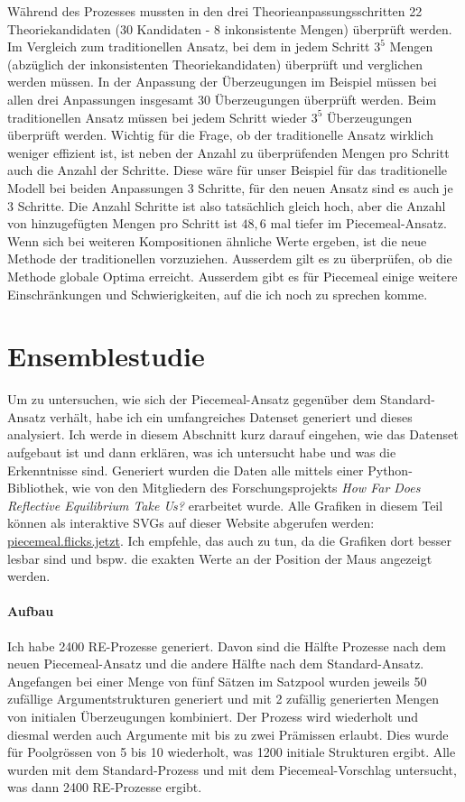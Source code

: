 \documentclass{article}
\begin{document}
 Während des Prozesses mussten in den drei Theorieanpassungsschritten 22 Theoriekandidaten (30 Kandidaten - 8 inkonsistente Mengen) überprüft werden.  Im Vergleich zum traditionellen Ansatz, bei dem in jedem Schritt $3^5$ Mengen (abzüglich der inkonsistenten Theoriekandidaten) überprüft und verglichen werden müssen. In der Anpassung der Überzeugungen im Beispiel müssen bei allen drei Anpassungen insgesamt 30 Überzeugungen überprüft werden. Beim traditionellen Ansatz müssen bei jedem Schritt wieder $3^5$ Überzeugungen überprüft werden. Wichtig für die Frage, ob der traditionelle Ansatz wirklich weniger effizient ist, ist neben der Anzahl zu überprüfenden Mengen pro Schritt auch die Anzahl der Schritte. Diese wäre für unser Beispiel für das traditionelle Modell bei beiden Anpassungen 3 Schritte, für den neuen Ansatz sind es auch je 3 Schritte. Die Anzahl Schritte ist also tatsächlich gleich hoch, aber die Anzahl von hinzugefügten Mengen pro Schritt ist $48,6$ mal tiefer im Piecemeal-Ansatz. Wenn sich bei weiteren Kompositionen ähnliche Werte ergeben, ist die neue Methode der traditionellen vorzuziehen. Ausserdem gilt es zu überprüfen, ob die Methode globale Optima erreicht. Ausserdem gibt es für Piecemeal einige weitere Einschränkungen und Schwierigkeiten, auf die ich noch zu sprechen komme.

\section{Ensemblestudie} \label{Ensemblestudie}

Um zu untersuchen, wie sich der Piecemeal-Ansatz gegenüber dem Standard-Ansatz verhält, habe ich ein umfangreiches Datenset generiert und dieses analysiert. Ich werde in diesem Abschnitt kurz darauf eingehen, wie das Datenset aufgebaut ist und dann erklären, was ich untersucht habe und was die Erkenntnisse sind. Generiert wurden die Daten alle mittels einer Python-Bibliothek, wie von den Mitgliedern des Forschungsprojekts \textit{How Far Does Reflective Equilibrium Take Us?} erarbeitet wurde. Alle Grafiken in diesem Teil können als interaktive SVGs auf dieser Website abgerufen werden: \href{https://piecemeal.flicks.jetzt/}{piecemeal.flicks.jetzt}. Ich empfehle, das auch zu tun, da die Grafiken dort besser lesbar sind und bspw. die exakten Werte an der Position der Maus angezeigt werden.

\paragraph{Aufbau} Ich habe 2400 RE-Prozesse generiert. Davon sind die Hälfte Prozesse nach dem neuen Piecemeal-Ansatz und die andere Hälfte nach dem Standard-Ansatz. Angefangen bei einer Menge von fünf Sätzen im Satzpool wurden jeweils 50 zufällige Argumentstrukturen generiert und mit 2 zufällig generierten Mengen von initialen Überzeugungen kombiniert. Der Prozess wird wiederholt und diesmal werden auch Argumente mit bis zu zwei Prämissen erlaubt. Dies wurde für Poolgrössen von 5 bis 10 wiederholt, was 1200 initiale Strukturen ergibt. Alle wurden mit dem Standard-Prozess und mit dem Piecemeal-Vorschlag untersucht, was dann 2400 RE-Prozesse ergibt.
\end{document}
